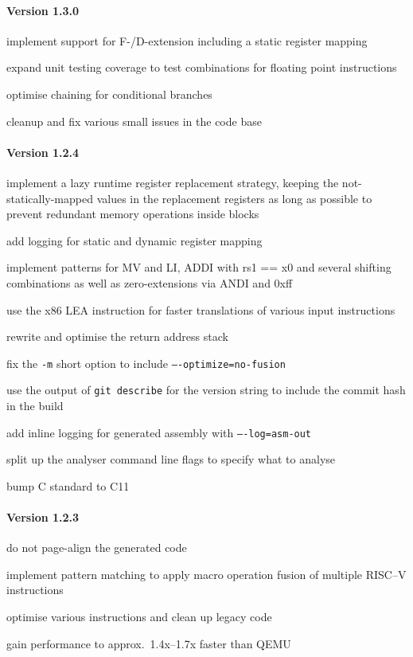 \paragraph{Version 1.3.0}
\begin{itemize*}
 	\item implement support for F-/D-extension including a static register mapping
 	\item expand unit testing coverage to test combinations for floating point instructions
 	\item optimise chaining for conditional branches
 	\item cleanup and fix various small issues in the code base
\end{itemize*}


\paragraph{Version 1.2.4}
\begin{itemize*}
 	\item implement a lazy runtime register replacement strategy, keeping the not-statically-mapped values in the replacement registers as long as possible to prevent redundant memory operations inside blocks
 	\item add logging for static and dynamic register mapping
 	\item implement patterns for MV and LI, ADDI with rs1 == x0 and several shifting combinations as well as zero-extensions via ANDI and 0xff
 	\item use the x86 LEA instruction for faster translations of various input instructions
 	\item rewrite and optimise the return address stack
 	\item fix the \texttt{-m} short option to include \texttt{----optimize=no-fusion}
 	\item use the output of \texttt{git describe} for the version string to include the commit hash in the build
 	\item add inline logging for generated assembly with \texttt{----log=asm-out}
 	\item split up the analyser command line flags to specify what to analyse
 	\item bump C standard to C11
\end{itemize*}


\paragraph{Version 1.2.3}
\begin{itemize*}
 	\item do not page-align the generated code
 	\item implement pattern matching to apply macro operation fusion of multiple RISC--V instructions
 	\item optimise various instructions and clean up legacy code
 	\item gain performance to approx.\ 1.4x--1.7x faster than QEMU
\end{itemize*}


